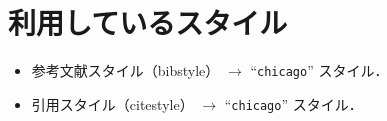 \documentclass[10pt]{jlreq}
\begin{document}
\section{利用しているスタイル}

\begin{itemize}
 \item 参考文献スタイル（bibstyle） $\rightarrow$ ``\texttt{chicago}'' スタイル．
 \item 引用スタイル（citestyle） $\rightarrow$ ``\texttt{chicago}'' スタイル．
\end{itemize}


\end{document}
